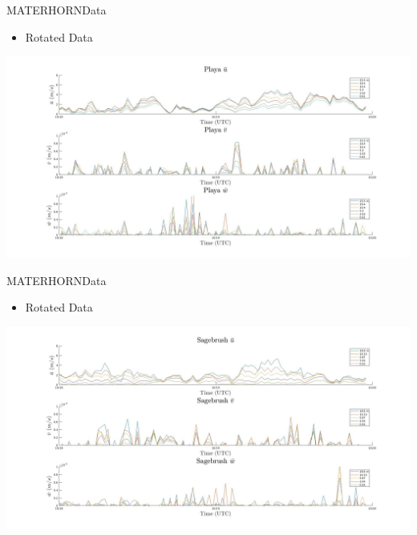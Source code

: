 \documentclass{beamer}
\begin{document}
\begin{frame}{MATERHORN}{Data}
	\begin{itemize}
	\item Rotated Data
	\end{itemize}
	\includegraphics[width=\linewidth]{plots/playarotate}
\end{frame}

\begin{frame}{MATERHORN}{Data}
	\begin{itemize}
	\item Rotated Data
	\end{itemize}
	\includegraphics[width=\linewidth]{plots/sagerotate}
\end{frame}
\end{document}
